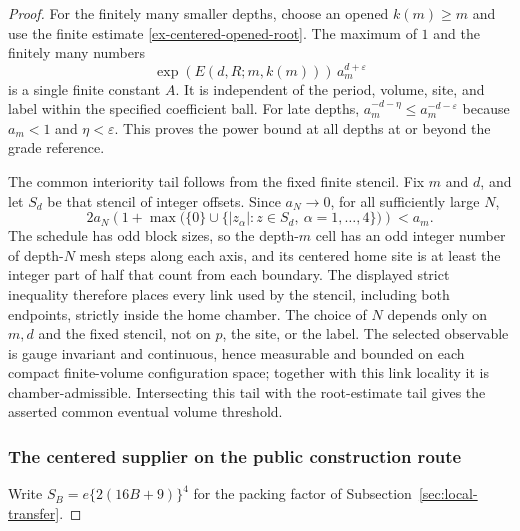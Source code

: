 \begin{proof}
For the finitely many smaller depths, choose an opened $k(m)\geq m$ and use the finite estimate \eqref{ex-centered-opened-root}. The maximum of $1$ and the finitely many numbers
\[
  \exp(E(d,R;m,k(m)))\,a_m^{d+\varepsilon}
\]
is a single finite constant $A$. It is independent of the period, volume, site, and label within the specified coefficient ball. For late depths, $a_m^{-d-\eta}\leq a_m^{-d-\varepsilon}$ because $a_m<1$ and $\eta<\varepsilon$. This proves the power bound at all depths at or beyond the grade reference.

The common interiority tail follows from the fixed finite stencil. Fix $m$ and $d$, and let $S_d$ be that stencil of integer offsets. Since $a_N\to0$, for all sufficiently large $N$,
\[
 2a_N\left(1+\max\bigl(\{0\}\cup\{|z_\alpha|:z\in S_d,\ \alpha=1,\ldots,4\}\bigr)\right)<a_m.
\]
The schedule has odd block sizes, so the depth-$m$ cell has an odd integer number of depth-$N$ mesh steps along each axis, and its centered home site is at least the integer part of half that count from each boundary. The displayed strict inequality therefore places every link used by the stencil, including both endpoints, strictly inside the home chamber. The choice of $N$ depends only on $m,d$ and the fixed stencil, not on $p$, the site, or the label. The selected observable is gauge invariant and continuous, hence measurable and bounded on each compact finite-volume configuration space; together with this link locality it is chamber-admissible. Intersecting this tail with the root-estimate tail gives the asserted common eventual volume threshold.

\subsubsection{The centered supplier on the public construction route}

Write $S_B=e\{2(16B+9)\}^4$ for the packing factor of Subsection~\ref{sec:local-transfer}.


\end{proof}
